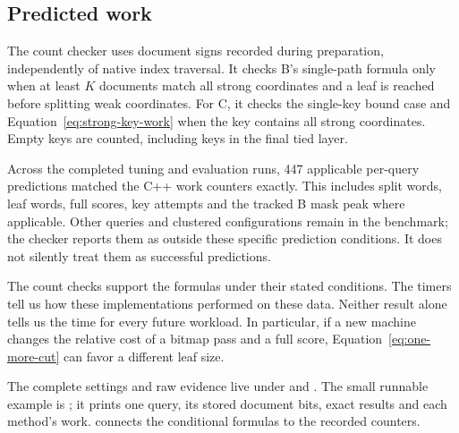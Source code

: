 \subsection{Predicted work}
The count checker uses document signs recorded during preparation, independently of native
index traversal. It checks B's single-path formula only when at least $K$ documents match all strong
coordinates and a leaf is reached before splitting weak coordinates. For C, it checks the
single-key bound case and Equation~\eqref{eq:strong-key-work} when the key contains all strong
coordinates. Empty keys are counted, including keys in the final tied layer.

Across the completed tuning and evaluation runs, 447 applicable per-query predictions matched
the C++ work counters exactly. This includes split words, leaf words, full scores, key attempts
and the tracked B mask peak where applicable. Other queries and clustered configurations remain
in the benchmark; the checker reports them as outside these specific prediction conditions.
It does not silently treat them as successful predictions.

The count checks support the formulas under their stated conditions. The timers tell us
how these implementations performed on these data. Neither result alone tells us the time
for every future workload. In particular, if a new
machine changes the relative cost of a bitmap pass and a full score, Equation~\eqref{eq:one-more-cut}
can favor a different leaf size.

The complete settings and raw evidence live under
 and
. The small runnable example is
; it prints one query, its stored document bits, exact results
and each method's work.  connects the conditional formulas
to the recorded counters.
